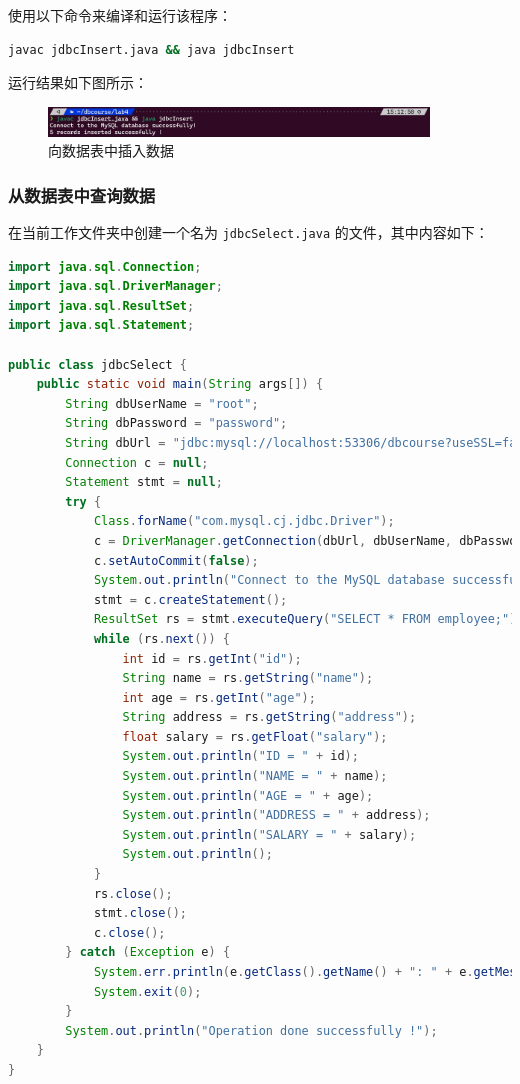 \documentclass{article}
\renewcommand\tt{\texttt}
\begin{document}
使用以下命令来编译和运行该程序：

\begin{lstlisting}[language=bash]
javac jdbcInsert.java && java jdbcInsert
\end{lstlisting}

运行结果如下图所示：

\begin{figure}[H]
  \centering
  \includegraphics[width=0.9\textwidth]{img/7.png}
  \caption{向数据表中插入数据}
\end{figure}

\subsubsection{从数据表中查询数据}

在当前工作文件夹中创建一个名为 \tt{jdbcSelect.java} 的文件，其中内容如下：

\begin{lstlisting}[language=java]
import java.sql.Connection;
import java.sql.DriverManager;
import java.sql.ResultSet;
import java.sql.Statement;

public class jdbcSelect {
    public static void main(String args[]) {
        String dbUserName = "root";
        String dbPassword = "password";
        String dbUrl = "jdbc:mysql://localhost:53306/dbcourse?useSSL=false&allowPublicKeyRetrieval=true";
        Connection c = null;
        Statement stmt = null;
        try {
            Class.forName("com.mysql.cj.jdbc.Driver");
            c = DriverManager.getConnection(dbUrl, dbUserName, dbPassword);
            c.setAutoCommit(false);
            System.out.println("Connect to the MySQL database successfully!");
            stmt = c.createStatement();
            ResultSet rs = stmt.executeQuery("SELECT * FROM employee;");
            while (rs.next()) {
                int id = rs.getInt("id");
                String name = rs.getString("name");
                int age = rs.getInt("age");
                String address = rs.getString("address");
                float salary = rs.getFloat("salary");
                System.out.println("ID = " + id);
                System.out.println("NAME = " + name);
                System.out.println("AGE = " + age);
                System.out.println("ADDRESS = " + address);
                System.out.println("SALARY = " + salary);
                System.out.println();
            }
            rs.close();
            stmt.close();
            c.close();
        } catch (Exception e) {
            System.err.println(e.getClass().getName() + ": " + e.getMessage());
            System.exit(0);
        }
        System.out.println("Operation done successfully !");
    }
}
\end{lstlisting}
\end{document}
